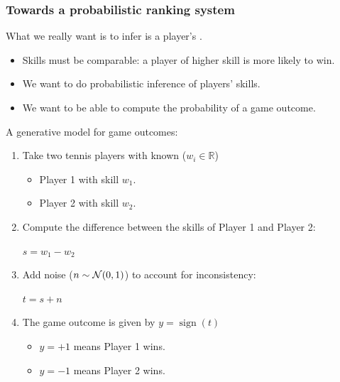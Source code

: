 \begin{frame}
\frametitle{Towards a probabilistic ranking system}

What we really want is to infer is a player's .
\begin{itemize}
\item Skills must be comparable: a player of higher skill is more likely to win.
\item We want to do probabilistic inference of players' skills.
\item We want to be able to compute the probability of a game outcome.
\end{itemize}

A generative model for game outcomes:
\begin{enumerate}
\item Take two tennis players with known  ($w_i\in\mathbb{R}$)
\begin{itemize}
\item Player 1 with skill $w_1$.
\item Player 2 with skill $w_2$.
\end{itemize}
\item Compute the difference between the skills of Player 1 and Player 2:\\
\centerline{ $s = w_1 - w_2$}
\item Add noise ($n\sim\mathcal{N}(0,1)$) to account for  inconsistency:\\
\centerline{$t = s + n$}
\item The game outcome is given by $y=\operatorname{sign}(t)$
\begin{itemize}
\item $y=+1$ means Player 1 wins.
\item $y=-1$ means Player 2 wins.
\end{itemize}
\end{enumerate}
\end{frame}



